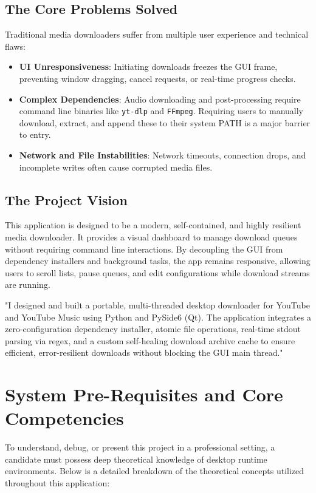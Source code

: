 \documentclass[12pt]{report}
\newenvironment{resumepitch}{
    \begin{tcolorbox}[colback=quoteback,colframe=bordercolor,arc=2mm,boxrule=1pt,left=15pt,right=15pt,top=10pt,bottom=10pt]
    \itshape\color{primary}
}{
    \end{tcolorbox}
}
\begin{document}
\section{The Core Problems Solved}
Traditional media downloaders suffer from multiple user experience and technical flaws:
\begin{itemize}[leftmargin=*]
    \item \textbf{UI Unresponsiveness}: Initiating downloads freezes the GUI frame, preventing window dragging, cancel requests, or real-time progress checks.
    \item \textbf{Complex Dependencies}: Audio downloading and post-processing require command line binaries like \texttt{yt-dlp} and \texttt{FFmpeg}. Requiring users to manually download, extract, and append these to their system PATH is a major barrier to entry.
    \item \textbf{Network and File Instabilities}: Network timeouts, connection drops, and incomplete writes often cause corrupted media files. 
\end{itemize}

\section{The Project Vision}
This application is designed to be a modern, self-contained, and highly resilient media downloader. It provides a visual dashboard to manage download queues without requiring command line interactions. By decoupling the GUI from dependency installers and background tasks, the app remains responsive, allowing users to scroll lists, pause queues, and edit configurations while download streams are running.

\begin{resumepitch}
"I designed and built a portable, multi-threaded desktop downloader for YouTube and YouTube Music using Python and PySide6 (Qt). The application integrates a zero-configuration dependency installer, atomic file operations, real-time stdout parsing via regex, and a custom self-healing download archive cache to ensure efficient, error-resilient downloads without blocking the GUI main thread."
\end{resumepitch}

\newpage
\chapter{System Pre-Requisites and Core Competencies}

To understand, debug, or present this project in a professional setting, a candidate must possess deep theoretical knowledge of desktop runtime environments. Below is a detailed breakdown of the theoretical concepts utilized throughout this application:
\end{document}
